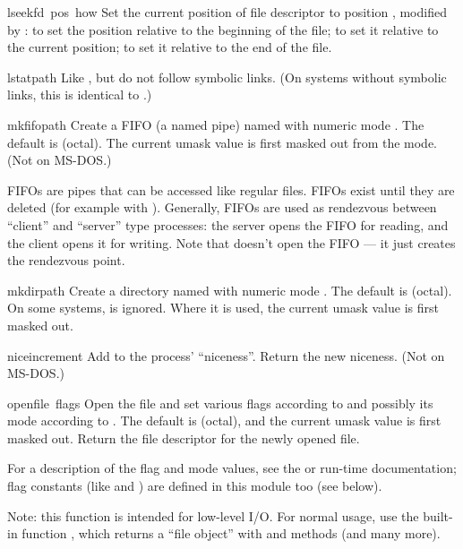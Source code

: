 \begin{funcdesc}{lseek}{fd\, pos\, how}
Set the current position of file descriptor  to position
, modified by :  to set the position
relative to the beginning of the file;  to set it relative to
the current position;  to set it relative to the end of the
file.
\end{funcdesc}

\begin{funcdesc}{lstat}{path}
Like , but do not follow symbolic links.  (On systems
without symbolic links, this is identical to .)
\end{funcdesc}

\begin{funcdesc}{mkfifo}{path}
Create a FIFO (a \POSIX{} named pipe) named  with numeric mode
.  The default  is  (octal).  The current
umask value is first masked out from the mode.
(Not on MS-DOS.)

FIFOs are pipes that can be accessed like regular files.  FIFOs exist
until they are deleted (for example with ).
Generally, FIFOs are used as rendezvous between ``client'' and
``server'' type processes: the server opens the FIFO for reading, and
the client opens it for writing.  Note that 
doesn't open the FIFO --- it just creates the rendezvous point.
\end{funcdesc}

\begin{funcdesc}{mkdir}{path}
Create a directory named  with numeric mode .
The default  is  (octal).  On some systems,
 is ignored.  Where it is used, the current umask value is
first masked out.
\end{funcdesc}

\begin{funcdesc}{nice}{increment}
Add  to the process' ``niceness''.  Return the new
niceness.  (Not on MS-DOS.)
\end{funcdesc}

\begin{funcdesc}{open}{file\, flags}
Open the file  and set various flags according to
 and possibly its mode according to .
The default  is  (octal), and the current umask
value is first masked out.  Return the file descriptor for the newly
opened file.

For a description of the flag and mode values, see the \UNIX{} or \C{}
run-time documentation; flag constants (like  and
) are defined in this module too (see below).

Note: this function is intended for low-level I/O.  For normal usage,
use the built-in function , which returns a ``file
object'' with  and  methods (and many
more).
\end{funcdesc}

